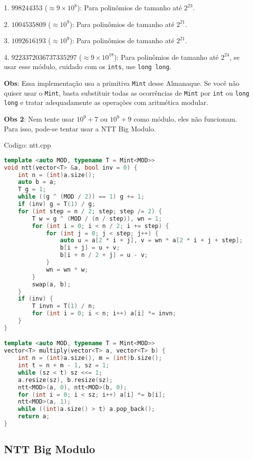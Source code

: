 \documentclass[10pt, a4paper, oneside]{book}
\begin{document}
1. $998244353$ ($\approx 9 \times 10^8$): Para polinômios de tamanho até $2^{23}$.

2. $1004535809$ ($\approx 10^9$): Para polinômios de tamanho até $2^{21}$.

3. $1092616193$ ($\approx 10^9$): Para polinômios de tamanho até $2^{21}$.

4. $9223372036737335297$ ($\approx 9 \times 10^{18}$): Para polinômios de tamanho até $2^{24}$, se usar esse módulo, cuidado com os \texttt{ints}, use \texttt{long long}.



\textbf{Obs}: Essa implementação usa a primitiva \texttt{Mint} desse Almanaque. Se você não quiser usar o \texttt{Mint}, basta substituir todas as ocorrências de \texttt{Mint} por \texttt{int} ou \texttt{long long} e tratar adequadamente as operações com aritmética modular.



\textbf{Obs 2}: Nem tente usar $10^9 + 7$ ou $10^9 + 9$ como módulo, eles não funcionam. Para isso, pode-se tentar usar a NTT Big Modulo.
\hfill

Codigo: ntt.cpp

\begin{lstlisting}[language=C++]
template <auto MOD, typename T = Mint<MOD>>
void ntt(vector<T> &a, bool inv = 0) {
    int n = (int)a.size();
    auto b = a;
    T g = 1;
    while ((g ^ (MOD / 2)) == 1) g += 1;
    if (inv) g = T(1) / g;
    for (int step = n / 2; step; step /= 2) {
        T w = g ^ (MOD / (n / step)), wn = 1;
        for (int i = 0; i < n / 2; i += step) {
            for (int j = 0; j < step; j++) {
                auto u = a[2 * i + j], v = wn * a[2 * i + j + step];
                b[i + j] = u + v;
                b[i + n / 2 + j] = u - v;
            }
            wn = wn * w;
        }
        swap(a, b);
    }
    if (inv) {
        T invn = T(1) / n;
        for (int i = 0; i < n; i++) a[i] *= invn;
    }
}

template <auto MOD, typename T = Mint<MOD>>
vector<T> multiply(vector<T> a, vector<T> b) {
    int n = (int)a.size(), m = (int)b.size();
    int t = n + m - 1, sz = 1;
    while (sz < t) sz <<= 1;
    a.resize(sz), b.resize(sz);
    ntt<MOD>(a, 0), ntt<MOD>(b, 0);
    for (int i = 0; i < sz; i++) a[i] *= b[i];
    ntt<MOD>(a, 1);
    while ((int)a.size() > t) a.pop_back();
    return a;
}\end{lstlisting}
\hfill

\subsection{NTT Big Modulo}
\end{document}
